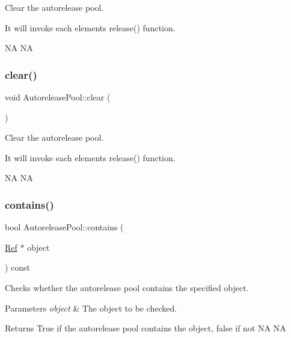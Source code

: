 Clear the autorelease pool.

It will invoke each element\textquotesingle{}s {\ttfamily release()} function.

NA  NA \mbox{\label{classAutoreleasePool_a4a63abbe5e742993c70760810d1a8442}} 
\subsubsection{\texorpdfstring{clear()}{clear()}\hspace{0.1cm}{\footnotesize\ttfamily [2/2]}}
{\footnotesize\ttfamily void Autorelease\+Pool\+::clear (\begin{DoxyParamCaption}{ }\end{DoxyParamCaption})}

Clear the autorelease pool.

It will invoke each element\textquotesingle{}s {\ttfamily release()} function.

NA  NA \mbox{\label{classAutoreleasePool_ab79484b084ab8dcb8799c71a34a653fc}} 
\subsubsection{\texorpdfstring{contains()}{contains()}\hspace{0.1cm}{\footnotesize\ttfamily [1/2]}}
{\footnotesize\ttfamily bool Autorelease\+Pool\+::contains (\begin{DoxyParamCaption}\item[{\hyperlink{classRef}{Ref} $\ast$}]{object }\end{DoxyParamCaption}) const}

Checks whether the autorelease pool contains the specified object.


\begin{DoxyParams}{Parameters}
{\em object} & The object to be checked. \\
\hline
\end{DoxyParams}
\begin{DoxyReturn}{Returns}
True if the autorelease pool contains the object, false if not  NA  NA 
\end{DoxyReturn}
\mbox{\label{classAutoreleasePool_ab79484b084ab8dcb8799c71a34a653fc}} 
